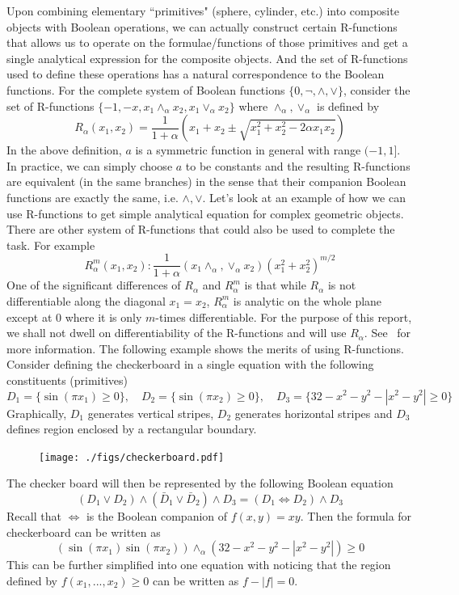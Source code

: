\documentclass[11pt]{amsart}
\theoremstyle{definition}
\begin{document}
Upon combining elementary ``primitives" (sphere, cylinder, etc.) into composite objects with Boolean operations, we can actually construct certain R-functions that allows us to operate on the formulae/functions of those primitives and get a single analytical expression for the composite objects. And the set of R-functions used to define these operations has a natural correspondence to the Boolean functions. For the complete system of Boolean functions $\{0, \neg, \wedge, \vee\}$, consider the set of R-functions $\{-1,-x, x_1\wedge_\alpha x_2, x_1\vee_\alpha x_2\}$ where $\wedge_\alpha, \vee_\alpha$ is defined by
$$R_\alpha(x_1,x_2)=\frac{1}{1+\alpha} (x_1+x_2\pm \sqrt{x_1^2+x_2^2-2\alpha x_1x_2})$$
In the above definition, $a$ is a symmetric function in general with range $(-1,1]$. In practice, we can simply choose $a$ to be constants and the resulting R-functions are equivalent (in the same branches) in the sense that their companion Boolean functions are exactly the same, i.e. $\wedge,\vee$. Let's look at an example of how we can use R-functions to get simple analytical equation for complex geometric objects. There are other system of R-functions that could also be used to complete the task. For example
$$R_{\alpha}^m(x_1,x_2): \frac{1}{1+\alpha} (x_1 \wedge_\alpha ,\vee_\alpha x_2)(x_1^2+x_2^2)^{m/2}$$
One of the significant differences of $R_\alpha$ and $R_{\alpha}^{m}$ is that while $R_\alpha$ is not differentiable along the diagonal $x_1=x_2$, $R_{\alpha}^m$ is analytic on the whole plane except at $0$ where it is only $m$-times differentiable. For the purpose of this report, we shall not dwell on differentiability of the R-functions and will use $R_\alpha$. See~\cite{Shapiro} for more information.
The following example shows the merits of using R-functions. Consider defining the checkerboard in a single equation with the following constituents (primitives) 
$$D_1=\{\sin(\pi x_1)\geq 0\}, \quad D_2=\{\sin(\pi x_2)\geq 0\},\quad D_3=\{32-x^2-y^2-|x^2-y^2|\geq 0\}$$ 
Graphically, $D_1$ generates vertical stripes, $D_2$ generates horizontal stripes and $D_3$ defines region enclosed by a rectangular boundary. 
\begin{figure}[H]
\texttt{[image: ./figs/checkerboard.pdf]}
\end{figure}

The checker board will then be represented by the following Boolean equation
$$(D_1\vee D_2)\wedge (\bar{D}_1\vee \bar{D}_2)\wedge D_3=(D_1\Leftrightarrow D_2)\wedge D_3$$
Recall that $\Leftrightarrow$ is the Boolean companion of $f(x,y)=xy$. Then the formula for checkerboard can be written as 
$$(\sin(\pi x_1)\sin(\pi x_2)) \wedge_\alpha (32-x^2-y^2-|x^2-y^2|) \geq 0$$
This can be further simplified into one equation with noticing that the region defined by $f(x_1,...,x_2)\geq 0$ can be written as $f-|f|= 0$.  
\end{document}
